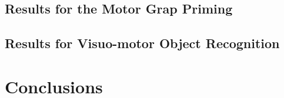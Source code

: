 \documentclass{article}
\begin{document}
\subsection{Results for the Motor Grap Priming}
\label{sec:3.2}


\subsection{Results for Visuo-motor Object Recognition}
\label{sec:3.3}


\section{Conclusions}






\end{document}

